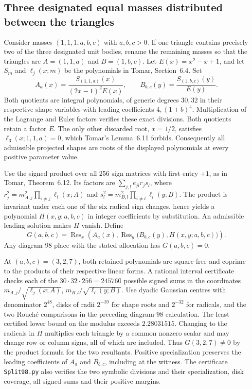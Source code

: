 \documentclass[11pt]{article}
\begin{document}
\subsection{Three designated equal masses distributed between the triangles}
Consider masses $(1,1,1,a,b,c)$ with $a,b,c>0$.
If one triangle contains precisely two of the three designated unit bodies,
rename the remaining masses so that the triangles are
$A=(1,1,a)$ and $B=(1,b,c)$.
Let $E(x)=x^2-x+1$, and let $S_m$ and $\ell_j(x;m)$ be the
polynomials in Tomar, Section~6.4. Set
\[
 A_a(x)=\frac{S_{(1,1,a)}(x)}{(2x-1)^2E(x)},\qquad
 B_{b,c}(y)=\frac{S_{(1,b,c)}(y)}{E(y)}.
\]
Both quotients are integral polynomials, of generic degrees $30,32$
in their respective shape variables with leading coefficients
$4,(1+b)^4$. Multiplication of the Lagrange and Euler factors verifies
these exact divisions. Both quotients retain a factor $E$.
The only other discarded root, $x=1/2$, satisfies
$\ell_3(x;1,1,a)=0$, which Tomar's Lemma~6.11 forbids.
Consequently all admissible projected shapes are roots of the displayed
polynomials at every positive parameter value.

Use the signed product over all 256 sign matrices with first entry $+1$,
as in Tomar, Theorem~6.12. Its factors are
$\sum_{j,l}e_{jl}r_j s_l$, where
$r_j^2=m_{A,j}^2\prod_{i\ne j}\ell_i(x;A)$ and
$s_l^2=m_{B,l}^2\prod_{i\ne l}\ell_i(y;B)$. The product
is invariant under each one of the six radical sign changes, hence yields
a polynomial $H(x,y;a,b,c)$ in integer coefficients by substitution.
An admissible leading solution makes $H$ vanish. Define
\[
 G(a,b,c)=\operatorname{Res}_x\!\left(A_a(x),
             \operatorname{Res}_y\big(B_{b,c}(y),H(x,y;a,b,c)\big)\right).
\]
Any diagram-98 place with the stated allocation has $G(a,b,c)=0$.

At $(a,b,c)=(3,2,7)$, both retained polynomials are square-free and
coprime to the products of their respective linear forms. A rational
interval certificate checks each of the $30\cdot32\cdot256=245760$
possible signed sums in the coordinates
$m_{A,j}/\sqrt{\ell_j(x;A)}$, $m_{B,l}/\sqrt{\ell_l(y;B)}$.
Use dyadic Gaussian centres with denominator $2^{48}$, disks of radii
$2^{-39}$ for shape roots and $2^{-32}$ for radicals, and the two
Rouch\'e comparisons in the preceding diagram-98 calculation.
The least certified lower bound on the modulus exceeds $2.28031515$.
Changing to the radicals in $H$ multiplies each triangle by a common
nonzero scalar and may change row or column signs, all of which are
included. Thus $G(3,2,7)\ne0$ by the product formula for the two
resultants. Positive specialization preserves the leading coefficients of
$A_a$ and $B_{b,c}$, including at the witness. The certificate
\texttt{Split98.py} also verifies the two symbolic divisions and their
specialization, disk coverage, all signed sums and their positive margins.
\end{document}
